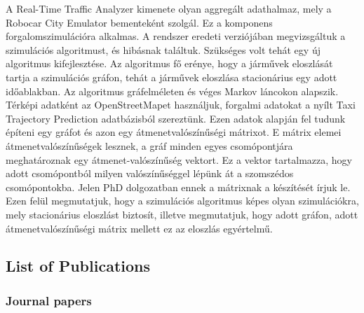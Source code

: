 \documentclass[b5paper,12pt]{report}
\theoremstyle{definition}
\begin{document}
\begin{otherlanguage}{hungarian}
A Real-Time Traffic Analyzer kimenete olyan aggregált adathalmaz, mely a Robocar City Emulator bementeként szolgál. Ez a komponens forgalomszimulációra alkalmas. A rendszer eredeti verziójában megvizsgáltuk a szimulációs algoritmust, és hibásnak találtuk. Szükséges volt tehát egy új algoritmus kifejlesztése. Az algoritmus fő erénye, hogy a járművek eloszlását tartja a szimulációs gráfon, tehát a járművek eloszlása stacionárius egy adott időablakban. Az algoritmus gráfelméleten és véges Markov láncokon alapszik. Térképi adatként az OpenStreetMapet használjuk, forgalmi adatokat a nyílt Taxi Trajectory Prediction adatbázisból szereztünk. Ezen adatok alapján fel tudunk építeni egy gráfot és azon egy átmenetvalószínűségi mátrixot. E mátrix elemei átmenetvalószínűségek lesznek, a gráf minden egyes csomópontjára meghatároznak egy átmenet-valószínűség vektort. Ez a vektor tartalmazza, hogy adott csomópontból milyen valószínűséggel lépünk át a szomszédos csomópontokba. Jelen PhD dolgozatban ennek a mátrixnak a készítését írjuk le. Ezen felül megmutatjuk, hogy a szimulációs algoritmus képes olyan szimulációkra, mely stacionárius eloszlást biztosít, illetve megmutatjuk, hogy adott gráfon, adott átmenetvalószínűségi mátrix mellett ez az eloszlás egyértelmű.
\end{otherlanguage}

\newpage
\subsection*{List of Publications}

\subsubsection*{Journal papers}
\end{document}
